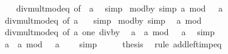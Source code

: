 \begin{isabellebody}
%
\isadelimproof
\ \ %
\endisadelimproof
%
\isatagproof
{}\isamarkupfalse%
\ div{\isacharunderscore}{\kern0pt}mult{\isacharunderscore}{\kern0pt}mod{\isacharunderscore}{\kern0pt}eq\ {\isacharbrackleft}{\kern0pt}of\ {}\ a{\isacharbrackright}{\kern0pt}\ \isamarkupfalse%
\ simp%
\endisatagproof
{\isafoldproof}%
%
\isadelimproof
\isanewline
%
\endisadelimproof
\isanewline
{}\isamarkupfalse%
\ mod{\isacharunderscore}{\kern0pt}by{\isacharunderscore}{\kern0pt}{}\ {\isacharbrackleft}{\kern0pt}simp{\isacharbrackright}{\kern0pt}{\isacharcolon}{\kern0pt}\ {\isachardoublequoteopen}a\ mod\ {}\ {\isacharequal}{\kern0pt}\ a{\isachardoublequoteclose}\isanewline
%
\isadelimproof
\ \ %
\endisadelimproof
%
\isatagproof
{}\isamarkupfalse%
\ div{\isacharunderscore}{\kern0pt}mult{\isacharunderscore}{\kern0pt}mod{\isacharunderscore}{\kern0pt}eq\ {\isacharbrackleft}{\kern0pt}of\ a\ {}{\isacharbrackright}{\kern0pt}\ \isamarkupfalse%
\ simp%
\endisatagproof
{\isafoldproof}%
%
\isadelimproof
\isanewline
%
\endisadelimproof
\isanewline
{}\isamarkupfalse%
\ mod{\isacharunderscore}{\kern0pt}by{\isacharunderscore}{\kern0pt}{}\ {\isacharbrackleft}{\kern0pt}simp{\isacharbrackright}{\kern0pt}{\isacharcolon}{\kern0pt}\isanewline
\ \ {\isachardoublequoteopen}a\ mod\ {}\ {\isacharequal}{\kern0pt}\ {}{\isachardoublequoteclose}\isanewline
%
\isadelimproof
%
\endisadelimproof
%
\isatagproof
{}\isamarkupfalse%
\ {\isacharminus}{\kern0pt}\isanewline
\ \ \isamarkupfalse%
\ div{\isacharunderscore}{\kern0pt}mult{\isacharunderscore}{\kern0pt}mod{\isacharunderscore}{\kern0pt}eq\ {\isacharbrackleft}{\kern0pt}of\ a\ one{\isacharbrackright}{\kern0pt}\ div{\isacharunderscore}{\kern0pt}by{\isacharunderscore}{\kern0pt}{}\ \isamarkupfalse%
\ {\isachardoublequoteopen}a\ {\isacharplus}{\kern0pt}\ a\ mod\ {}\ {\isacharequal}{\kern0pt}\ a{\isachardoublequoteclose}\ \isamarkupfalse%
\ simp\isanewline
\ \ \isamarkupfalse%
\ \isamarkupfalse%
\ {\isachardoublequoteopen}a\ {\isacharplus}{\kern0pt}\ a\ mod\ {}\ {\isacharequal}{\kern0pt}\ a\ {\isacharplus}{\kern0pt}\ {}{\isachardoublequoteclose}\ \isamarkupfalse%
\ simp\isanewline
\ \ \isamarkupfalse%
\ \isamarkupfalse%
\ {\isacharquery}{\kern0pt}thesis\ \isamarkupfalse%
\ {\isacharparenleft}{\kern0pt}rule\ add{\isacharunderscore}{\kern0pt}left{\isacharunderscore}{\kern0pt}imp{\isacharunderscore}{\kern0pt}eq{\isacharparenright}{\kern0pt}\isanewline

\end{isabellebody}
